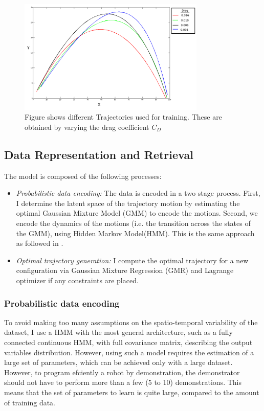 \documentclass[conference]{IEEEtran}
\begin{document}
\begin{figure}[!t]
\centering
\includegraphics[width=3.5in]{fig2}
\caption{Figure shows different Trajectories used for training. These are obtained by varying the drag coefficient $C_{D}$}
\label{fig:fig2}
\end{figure}

\subsection{Data Representation and Retrieval}
The model is composed of the following processes:
\begin{itemize}
\item{
    \emph{Probabilistic data encoding:} The data is encoded in a two stage process. First, I determine the latent space of the trajectory motion by estimating the optimal Gaussian Mixture Model (GMM) to encode the motions. Second, we encode the dynamics of the motions (i.e. the transition across the states of the GMM), using Hidden Markov Model(HMM). This is the same approach as followed in \cite{ref:7}.
}    
\item{
    \emph{Optimal trajectory generation:} I compute the optimal trajectory for a new configuration via Gaussian Mixture Regression (GMR) and Lagrange optimizer if any constraints are placed.
}    
\end{itemize}

\subsubsection{Probabilistic data encoding}
To avoid making too many assumptions on the spatio-temporal variability of the dataset, I use a HMM with the most general architecture, such as a fully connected continuous HMM, with full covariance matrix, describing the output variables distribution. However, using such a model requires the estimation of a large set of parameters, which can be achieved only with a large dataset. However, to program efciently a robot by demonstration, the demonstrator should not have to perform more than a few (5 to 10) demonstrations. This means that the set of parameters to learn is quite large, compared to the amount of training data. 
\end{document}
